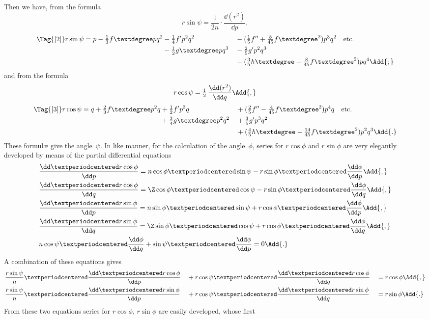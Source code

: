 Then we have, from the formula
\[
r\sin\psi = \frac{1}{2n}·\frac{\dd(r^{2})}{\dd p},
\]
\begin{alignat*}{2}
\Tag{[2]}
r\sin\psi = p - \tfrac{1}{3}f°pq^{2}
  & -\tfrac{1}{4}f'p^{2}q^{2} &&- (\tfrac{1}{5}f'' + \tfrac{8}{45}{f°}^{2})p^{3}q^{2}\quad\text{etc.} \\
  & -\tfrac{1}{2}g°pq^{3} &&-\tfrac{2}{5}g'p^{2}q^{3} \\
  &&& -(\tfrac{3}{5}h° - \tfrac{8}{45}{f°}^{2})pq^{4}\Add{;}
\end{alignat*}
and from the formula
\[
r\cos\psi = \tfrac{1}{2}\, \frac{\dd(r^{2})}{\dd q}\Add{,}
\]
\begin{alignat*}{2}
\Tag{[3]}
r\cos\psi = q + \tfrac{2}{3}f°p^{2}q
  & +\tfrac{1}{2}f'p^{3}q &&+ (\tfrac{2}{5}f'' - \tfrac{4}{45}{f°}^{2})p^{4}q\quad\text{etc.} \\
  & +\tfrac{3}{4}g°p^{2}q^{2} &&+\tfrac{3}{5}g'p^{3}q^{2} \\
  &&& +(\tfrac{4}{5}h° - \tfrac{14}{45}{f°}^{2})p^{2}q^{3}\Add{.}
\end{alignat*}
These formulæ give the angle~$\psi$. In like manner, for the calculation of the angle~$\phi$,
series for $r\cos\phi$ and $r\sin\phi$ are very elegantly developed by means of the partial
differential equations
\begin{align*}
&\frac{\dd·r\cos\phi}{\dd p}
  = n\cos\phi·\sin\psi - r\sin\phi·\frac{\dd\phi}{\dd p}\Add{,} \\
&\frac{\dd·r\cos\phi}{\dd q}
  = \Z\cos\phi·\cos\psi - r\sin\phi·\frac{\dd\phi}{\dd q}\Add{,} \\
&\frac{\dd·r\sin\phi}{\dd p}
  = n\sin\phi·\sin\psi + r\cos\phi·\frac{\dd\phi}{\dd p}\Add{,} \\
&\frac{\dd·r\sin\phi}{\dd q}
  = \Z\sin\phi·\cos\psi + r\cos\phi·\frac{\dd\phi}{\dd q}\Add{,} \\
&n\cos\psi·\frac{\dd\phi}{\dd q} + \sin\psi·\frac{\dd\phi}{\dd p} = 0\Add{.}
\end{align*}
A combination of these equations gives
\begin{alignat*}{3}
&\frac{r\sin\psi}{n}·\frac{\dd·r\cos\phi}{\dd p}
  &&+ r\cos\psi·\frac{\dd·r\cos\phi}{\dd q}
  &&= r\cos\phi\Add{,} \\
&\frac{r\sin\psi}{n}·\frac{\dd·r\sin\phi}{\dd p}
  &&+ r\cos\psi·\frac{\dd·r\sin\phi}{\dd q}
  &&= r\sin\phi\Add{.}
\end{alignat*}
From these two equations series for $r\cos\phi$, $r\sin\phi$ are easily developed, whose first
